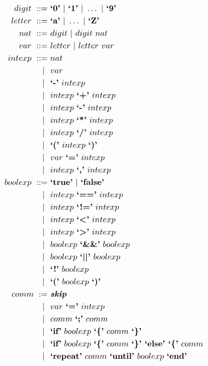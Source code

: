 \documentclass[11pt]{article}
\begin{document}
\begin{align*}
    digit\ ::=\ & \textbf{`0'}\ |\ \textbf{`1'}\ |\ \dots\ |\ \textbf{`9'} \\
    letter\ ::=\ & \textbf{`a'}\ |\ \dots\ |\ \textbf{`Z'} \\
    nat\ ::=\ & digit\ |\ digit\ nat \\
    var\ ::=\ & letter\ |\ letter\ var \\
    intexp\ ::=\ & nat \\
            |\ \ & var \\
            |\ \ & \textbf{`-'}\ intexp \\
            |\ \ & intexp\ \textbf{`+'}\ intexp \\ 
            |\ \ & intexp\ \textbf{`-'}\ intexp \\ 
            |\ \ & intexp\ \textbf{`*'}\ intexp \\ 
            |\ \ & intexp\ \textbf{`/'}\ intexp \\ 
            |\ \ & \textbf{`('}\ intexp\ \textbf{`)'} \\
            |\ \ & var\ \textbf{`='}\ intexp \\
            |\ \ & intexp\ \textbf{`,'}\ intexp \\
    boolexp\ ::=\ & \textbf{`true'}\ |\ \textbf{`false'} \\
             |\ \ & intexp\ \textbf{`=='}\ intexp \\
             |\ \ & intexp\ \textbf{`!='}\ intexp \\
             |\ \ & intexp\ \textbf{`<'}\ intexp \\
             |\ \ & intexp\ \textbf{`>'}\ intexp \\
             |\ \ & boolexp\ \textbf{`\&\&'}\ boolexp \\
             |\ \ & boolexp\ \textbf{`||'}\ boolexp \\
             |\ \ & \textbf{`!'}\ boolexp \\
             |\ \ & \textbf{`('}\ boolexp\ \textbf{`)'} \\
    comm\ :=\ & \textbf{\emph{skip}} \\
          |\ \ & var\ \textbf{`='}\ intexp \\
          |\ \ & comm\ \textbf{`;'}\ comm \\
          |\ \ & \textbf{`if'}\ boolexp\ \textbf{`\{'}\ comm\ \textbf{`\}'} \\
          |\ \ & \textbf{`if'}\ boolexp\ \textbf{`\{'}\ comm\ \textbf{`\}' `else' `\{'}\ comm \\
          |\ \ & \textbf{`repeat'}\ comm\ \textbf{`until'}\ boolexp\ \textbf{`end'}
\end{align*}
\end{document}
